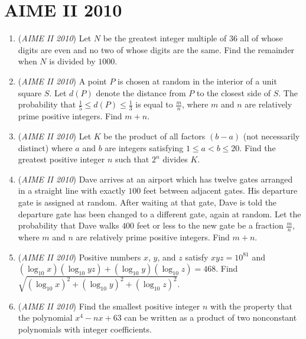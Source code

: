 \section{AIME II 2010}
        \begin{enumerate}
        	\item (\textit{AIME II 2010}) Let $N$ be the greatest integer multiple of $36$ all of whose digits are even and no two of whose digits are the same. Find the remainder when $N$ is divided by $1000$.


 

	\item (\textit{AIME II 2010}) A point $P$ is chosen at random in the interior of a unit square $S$. Let $d(P)$ denote the distance from $P$ to the closest side of $S$. The probability that $\frac{1}{5}\le d(P)\le\frac{1}{3}$ is equal to $\frac{m}{n}$, where $m$ and $n$ are relatively prime positive integers. Find $m+n$.


 

	\item (\textit{AIME II 2010}) Let $K$ be the product of all factors $(b-a)$ (not necessarily distinct) where $a$ and $b$ are integers satisfying $1\le a < b \le 20$. Find the greatest positive integer $n$ such that $2^n$ divides $K$.


 

	\item (\textit{AIME II 2010}) Dave arrives at an airport which has twelve gates arranged in a straight line with exactly $100$ feet between adjacent gates. His departure gate is assigned at random. After waiting at that gate, Dave is told the departure gate has been changed to a different gate, again at random. Let the probability that Dave walks $400$ feet or less to the new gate be a fraction $\frac{m}{n}$, where $m$ and $n$ are relatively prime positive integers. Find $m+n$.


 

	\item (\textit{AIME II 2010}) Positive numbers $x$, $y$, and $z$ satisfy $xyz = 10^{81}$ and $(\log_{10}x)(\log_{10} yz) + (\log_{10}y) (\log_{10}z) = 468$. Find $\sqrt {(\log_{10}x)^2 + (\log_{10}y)^2 + (\log_{10}z)^2}$.


 

	\item (\textit{AIME II 2010}) Find the smallest positive integer $n$ with the property that the polynomial $x^4 - nx + 63$ can be written as a product of two nonconstant polynomials with integer coefficients.



\end{enumerate}
